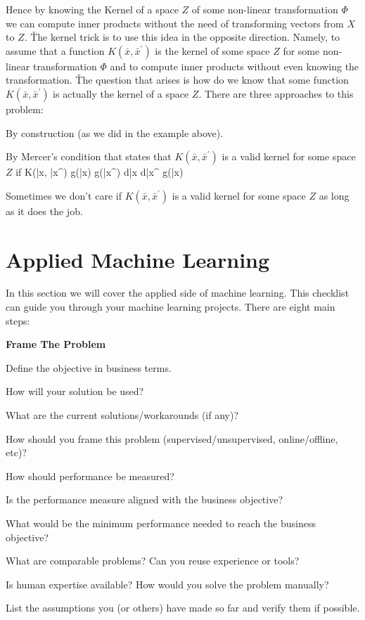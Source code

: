 Hence by knowing the Kernel of a space $Z$ of some non-linear transformation $\Phi$ we can compute inner products
without the need of transforming vectors from $X$ to $Z$. \v

The kernel trick is to use this idea in the opposite direction. Namely, to assume that a function $K(\bar{x},
\bar{x}^\prime)$ is the kernel of some space $Z$ for some non-linear transformation $\Phi$ and to compute inner
products without even knowing the transformation. \v

The question that arises is how do we know that some function $K(\bar{x}, \bar{x}^\prime)$ is actually the kernel of
a space $Z$. There are three approaches to this problem:
\ben
\item By construction (as we did in the example above).
\item By Mercer's condition that states that $K(\bar{x}, \bar{x}^\prime)$ is a valid kernel for some space $Z$ if
\bse
\int K(\bar{x}, \bar{x}^\prime) g(\bar{x}) g(\bar{x}^\prime) d\bar{x} d\bar{x}^\prime {} \:\:\: \forall \:\:\:
 \:\:\: g(\bar{x})
\ese

\item Sometimes we don't care if $K(\bar{x}, \bar{x}^\prime)$ is a valid kernel for some space $Z$ as long as it does
the job.
\een

\chapter{Applied Machine Learning}

In this section we will cover the applied side of machine learning. This checklist can guide you through your machine
learning projects. There are eight main steps:
\ben
\item \textbf{Frame The Problem}
\bit
\item Define the objective in business terms.
\item How will your solution be used?
\item What are the current solutions/workarounds (if any)?
\item How should you frame this problem (supervised/unsupervised, online/offline, etc)?
\item How should performance be measured?
\item Is the performance measure aligned with the business objective?
\item What would be the minimum performance needed to reach the business objective?
\item What are comparable problems? Can you reuse experience or tools?
\item Is human expertise available? How would you solve the problem manually?
\item List the assumptions you (or others) have made so far and verify them if possible.
\eit

